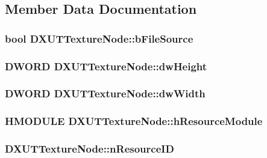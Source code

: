 \subsection{Member Data Documentation}
\hypertarget{struct_d_x_u_t_texture_node_a6908a18496ab40bac0b8c6e63b7d28e3}{
\subsubsection[{bFileSource}]{\setlength{\rightskip}{0pt plus 5cm}bool {\bf DXUTTextureNode::bFileSource}}}
\label{struct_d_x_u_t_texture_node_a6908a18496ab40bac0b8c6e63b7d28e3}
\hypertarget{struct_d_x_u_t_texture_node_a25c59cf0fc86a4630fa55f0550339cf6}{
\subsubsection[{dwHeight}]{\setlength{\rightskip}{0pt plus 5cm}DWORD {\bf DXUTTextureNode::dwHeight}}}
\label{struct_d_x_u_t_texture_node_a25c59cf0fc86a4630fa55f0550339cf6}
\hypertarget{struct_d_x_u_t_texture_node_a29af5db8b2da2c07c6461a2090159463}{
\subsubsection[{dwWidth}]{\setlength{\rightskip}{0pt plus 5cm}DWORD {\bf DXUTTextureNode::dwWidth}}}
\label{struct_d_x_u_t_texture_node_a29af5db8b2da2c07c6461a2090159463}
\hypertarget{struct_d_x_u_t_texture_node_a4e80e2d2c87816b394ed29294acc7909}{
\subsubsection[{hResourceModule}]{\setlength{\rightskip}{0pt plus 5cm}HMODULE {\bf DXUTTextureNode::hResourceModule}}}
\label{struct_d_x_u_t_texture_node_a4e80e2d2c87816b394ed29294acc7909}
\hypertarget{struct_d_x_u_t_texture_node_ae56b4afef5842ee40f2dd4c228b3b71d}{
\subsubsection[{nResourceID}]{ {\bf DXUTTextureNode::nResourceID}}}
